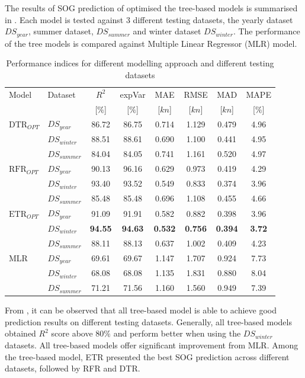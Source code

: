 The results of SOG prediction of optimised the tree-based models is summarised in . Each model is tested against 3 different testing datasets, the yearly dataset $DS_{year}$, summer dataset, $DS_{summer}$ and winter dataset $DS_{winter}$. The performance of the tree models is compared against Multiple Linear Regressor (MLR) model.

\begin{table}[ht]
    \small
    \centering
    {\begin{tabular}{ l l c c c c c c }
    \hline
    Model & Dataset & $R^2$ & expVar & MAE & RMSE & MAD & MAPE \\
    & & [$\%$] & [$\%$] & [$kn$] & [$kn$] & [$kn$] & [$\%$]  \\ 
    \hline
    $\text{DTR}_{OPT}$ & $DS_{year}$ & 86.72 & 86.75 & 0.714 & 1.129  & 0.479 & 4.96  \\
    & $DS_{winter}$ & 88.51 & 88.61 & 0.690 & 1.100 & 0.441 & 4.95 \\
    & $DS_{summer}$ & 84.04 & 84.05 & 0.741 & 1.161 & 0.520 & 4.97 \\
    $\text{RFR}_{OPT}$ & $DS_{year}$  & 90.13 & 96.16 & 0.629 & 0.973 & 0.419 & 4.29 \\
    & $DS_{winter}$ & 93.40 & 93.52 & 0.549 & 0.833 & 0.374 & 3.96 \\
    & $DS_{summer}$ & 85.48 & 85.48 & 0.696 & 1.108 & 0.455 & 4.66 \\
    $\text{ETR}_{OPT}$ & $DS_{year}$ & 91.09 & 91.91 & 0.582 & 0.882 & 0.398 & 3.96 \\
    & $DS_{winter}$ & \textbf{94.55} & \textbf{94.63} & \textbf{0.532} & \textbf{0.756} & \textbf{0.394} & \textbf{3.72} \\
    & $DS_{summer}$ & 88.11 & 88.13 & 0.637 & 1.002 & 0.409 & 4.23 \\
    MLR & $DS_{year}$ & 69.61 & 69.67 & 1.147 & 1.707 & 0.924 & 7.73 \\
    & $DS_{winter}$ & 68.08 & 68.08 & 1.135 & 1.831 & 0.880 & 8.04 \\
    & $DS_{summer}$ & 71.21 & 71.56 & 1.160 & 1.560 & 0.949 & 7.39 \\
    \hline
    \end{tabular}}
\caption{Performance indices for different modelling approach and different testing datasets}\label{tbl:testing_dataset_sog_result}
\end{table}

From , it can be observed that all tree-based model is able to achieve good prediction results on different testing datasets. Generally, all tree-based models obtained $R^2$ score above $80\%$ and perform better when using the $DS_{winter}$ datasets. All tree-based models offer significant improvement from MLR. Among the tree-based model, ETR presented the best SOG prediction across different datasets, followed by RFR and DTR.\\ 

